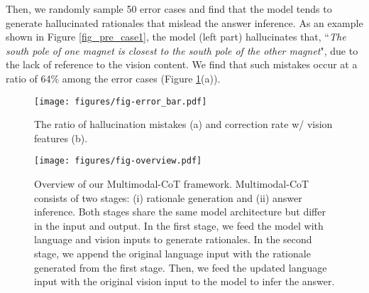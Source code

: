 \documentclass[nohyperref]{article}
\theoremstyle{plain}
\theoremstyle{definition}
\theoremstyle{remark}
\begin{document}
Then, we randomly sample 50 error cases and find that the model tends to generate hallucinated rationales that mislead the answer inference. As an example shown in Figure \ref{fig_pre_case1}, the model (left part) hallucinates that, ``\textit{The south pole of one magnet is closest to the south pole of the other magnet}", due to the lack of reference to the vision content. 
We find that such mistakes occur at a ratio of 64\% among the error cases (Figure \ref{fig_bar}(a)).






\begin{figure}[t]
  \begin{center}
   \texttt{[image: figures/fig-error\_bar.pdf]}
  \end{center}
  \vspace{-3.6mm}
  \caption{The ratio of hallucination mistakes (a) and correction rate w/ vision features (b).}
    \vspace{-3mm}
  \label{fig_bar}
\end{figure}


\begin{figure*}[htb]
  \begin{center}
\texttt{[image: figures/fig-overview.pdf]}
  \end{center}
  \vspace{-3mm}
  \caption{Overview of our Multimodal-CoT framework. Multimodal-CoT consists of two stages: (i) rationale generation and (ii) answer inference. Both stages share the same model architecture but differ in the input and output. In the first stage, we feed the model with language and vision inputs to generate rationales. In the second stage, we append the original language input with the rationale generated from the first stage. Then, we feed the updated language input with the original vision input to the model to infer the answer.}
  \label{fig_overview}
  \vspace{-3mm}
\end{figure*}
\end{document}
